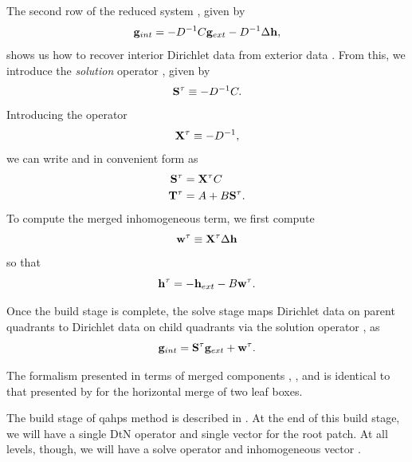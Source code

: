 The second row of the reduced system , given by 
\begin{equation}
\mathbf g_{int} = -D^{-1}C \mathbf g_{ext} -D^{-1} \Delta \mathbf h,
\end{equation}
shows us how to recover interior Dirichlet data \gint  from exterior data \gext.  
From this, we introduce the {\em solution} operator \Stau, given by 
\begin{equation}
\mathbf S^{\tau} \equiv -D^{-1}C.
\label{eq:Stau-merged}
\end{equation}
Introducing  the operator
\begin{equation}
\mathbf X^{\tau} \equiv -D^{-1},
\label{eq:xtau}
\end{equation}
we can write \Ttau and \Stau in convenient form as
\begin{equation}
\begin{aligned}
\mathbf S^{\tau} & = \mathbf X^{\tau} C \\
\mathbf T^{\tau} & = A + B\mathbf S^{\tau}.
\end{aligned}
\end{equation}
To compute the merged inhomogeneous term, we first compute
\begin{equation}
\mathbf w^{\tau} \equiv \mathbf X^{\tau}\Delta \mathbf h
\label{eq:wtau-merged}
\end{equation}
so that
\begin{equation}
\mathbf h^{\tau} = -\mathbf h_{ext} - B\mathbf w^{\tau}.
\label{eq:htau}
\end{equation}

Once the build stage is complete, the solve stage maps Dirichlet data on parent quadrants to Dirichlet data on child quadrants via the solution operator \Stau, as
\begin{equation}
\mathbf g_{int} = \mathbf S^{\tau} \mathbf g_{ext} + \mathbf w^{\tau}.
\label{eq:solve_eqn}
\end{equation}

The formalism presented in terms of merged components \Xtau, \Stau, \Ttau and \htau is identical to that presented by \cite{gillman2014direct} for the horizontal merge of two leaf boxes.

The build stage of \gls{qahps} method is described in . At the end of this build stage, we will have a single DtN operator \Ttau and single vector \htau for the root patch.  At all levels, though, we will have a solve operator \Stau and inhomogeneous vector \wtau.

